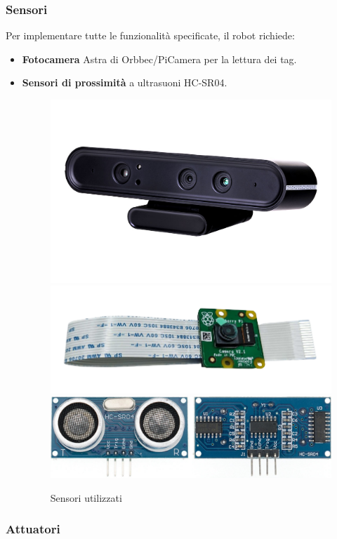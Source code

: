 \documentclass[]{article}
\begin{document}
\subsubsection{Sensori}
Per implementare tutte le funzionalità specificate, il robot richiede:
\begin{itemize}
    \item \textbf{Fotocamera} Astra di Orbbec/PiCamera per la lettura dei tag.
    \item \textbf{Sensori di prossimità} a ultrasuoni HC-SR04.
    \begin{figure}[H]
        \centering
        \includegraphics[height=0.18\linewidth]{immagini/astra_orbbec_s.jpg}
        \hspace*{5pt}
        \includegraphics[height=0.18\linewidth]{immagini/rpi-camera.png}
        \hspace*{5pt}
        \includegraphics[height=0.1\linewidth]{immagini/HC-SR04.jpg}
        \caption{Sensori utilizzati}
    \end{figure}      
\end{itemize}


\subsubsection{Attuatori}
\end{document}
